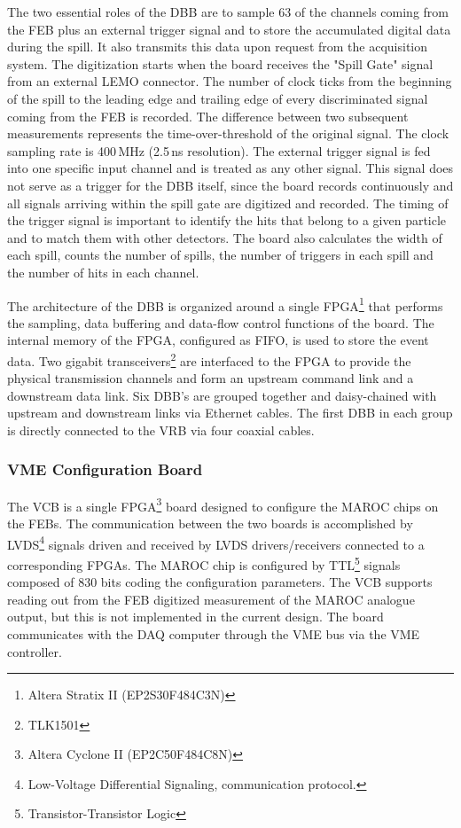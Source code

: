 \documentclass[a4paper,11pt]{article}
\begin{document}
The two essential roles of the DBB are to sample 63 of the channels coming from the FEB plus an external trigger signal and to store the accumulated
digital data during the spill. It also transmits this data upon request from the acquisition system. The digitization starts when the board
receives the "Spill Gate" signal from an external LEMO connector. The number of clock ticks from the beginning of the spill to the leading edge
and trailing edge of every discriminated signal coming from the FEB is recorded. The difference between two subsequent measurements represents
the time-over-threshold of the original signal. The clock sampling rate is 400\,MHz (2.5\,ns resolution). The external trigger signal is fed into
one specific input channel and is treated as any other signal. This signal does not serve as a trigger for the DBB itself, since the board records
continuously and all signals arriving within the spill gate are digitized and recorded. The timing of the trigger signal is important to identify
the hits that belong to a given particle and to match them with other detectors. The board also calculates the width of each spill, counts the number
of spills, the number of triggers in each spill and the number of hits in each channel.

The architecture of the DBB is organized around a single FPGA\footnote{Altera Stratix II (EP2S30F484C3N)} that performs the sampling, data
buffering and data-flow control functions of the board. The internal memory of the FPGA, configured as FIFO, is used to store the event data. Two
gigabit transceivers\footnote{TLK1501} are interfaced to the FPGA to provide the physical transmission channels and form an upstream command link and
a downstream data link. Six DBB's are grouped together and daisy-chained with upstream and downstream links via Ethernet cables. The first DBB in each
group is directly connected to the VRB via four coaxial cables.

\subsubsection{VME Configuration Board}
The VCB is a single FPGA\footnote{Altera Cyclone II (EP2C50F484C8N)} board designed to configure the MAROC chips on the FEBs. The
communication between the two boards is accomplished by LVDS\footnote{Low-Voltage Differential Signaling, communication protocol.} signals driven and
received by LVDS drivers/receivers connected to a corresponding FPGAs. The MAROC chip is configured by TTL\footnote{Transistor-Transistor
Logic} signals composed of 830 bits coding the configuration parameters. The VCB supports reading out from the FEB digitized measurement of the
MAROC analogue output, but this is not implemented in the current design. The board communicates with the DAQ computer through the VME bus via the
VME controller. 
\end{document}
